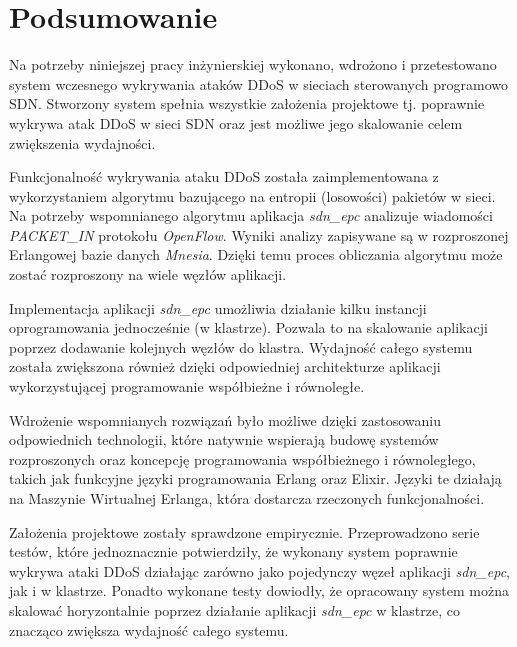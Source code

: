 \chapter{Podsumowanie}

Na potrzeby niniejszej pracy inżynierskiej wykonano, wdrożono i przetestowano
system wczesnego wykrywania ataków DDoS w sieciach sterowanych programowo SDN.
Stworzony system spełnia wszystkie założenia projektowe tj. poprawnie wykrywa
atak DDoS w sieci SDN oraz jest możliwe jego skalowanie celem zwiększenia
wydajności.

Funkcjonalność wykrywania ataku DDoS została zaimplementowana z wykorzystaniem
algorytmu bazującego na entropii (losowości) pakietów w sieci. Na potrzeby
wspomnianego algorytmu aplikacja \textit{sdn\_epc} analizuje wiadomości
\mbox{\textit{PACKET\_IN}} protokołu \textit{OpenFlow}. Wyniki analizy
zapisywane są w rozproszonej Erlangowej bazie danych \textit{Mnesia}. Dzięki
temu proces obliczania algorytmu może zostać rozproszony na wiele węzłów
aplikacji.

Implementacja aplikacji \textit{sdn\_epc} umożliwia działanie kilku instancji
oprogramowania jednocześnie (w klastrze). Pozwala to na skalowanie aplikacji
poprzez dodawanie kolejnych węzłów do klastra. Wydajność całego systemu została
zwiększona również dzięki odpowiedniej architekturze aplikacji wykorzystującej
programowanie współbieżne i równoległe.

Wdrożenie wspomnianych rozwiązań było możliwe dzięki zastosowaniu odpowiednich
technologii, które natywnie wspierają budowę systemów rozproszonych oraz
koncepcję programowania współbieżnego i równoległego, takich jak funkcyjne
języki programowania Erlang oraz Elixir. Języki te działają na Maszynie
Wirtualnej Erlanga, która dostarcza rzeczonych funkcjonalności.

Założenia projektowe zostały sprawdzone empirycznie. Przeprowadzono serie
testów, które jednoznacznie potwierdziły, że wykonany system poprawnie wykrywa
ataki DDoS działając zarówno jako pojedynczy węzeł aplikacji \textit{sdn\_epc},
jak i w klastrze. Ponadto wykonane testy dowiodły, że opracowany system można
skalować horyzontalnie poprzez działanie aplikacji \textit{sdn\_epc} w klastrze,
co znacząco zwiększa wydajność całego systemu.
